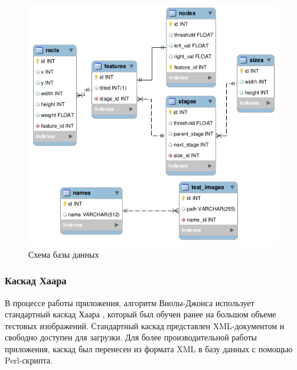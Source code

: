 \begin{figure}[hbtp]
    \centering
    \includegraphics[width=\textwidth]{er_diagram.png}
    \caption{Схема базы данных}
    \label{fig:er_diagram}
\end{figure}

\subsubsection{Каскад Хаара}

В процессе работы приложения, алгоритм Виолы-Джонса использует стандартный каскад Хаара \cite{haar_cascade},
который был обучен ранее на большом объеме тестовых изображений.
Стандартный каскад представлен XML-документом и свободно доступен для загрузки.
Для более производительной работы приложения, каскад был перенесен из формата
XML в базу данных с помощью Perl-скрипта.

